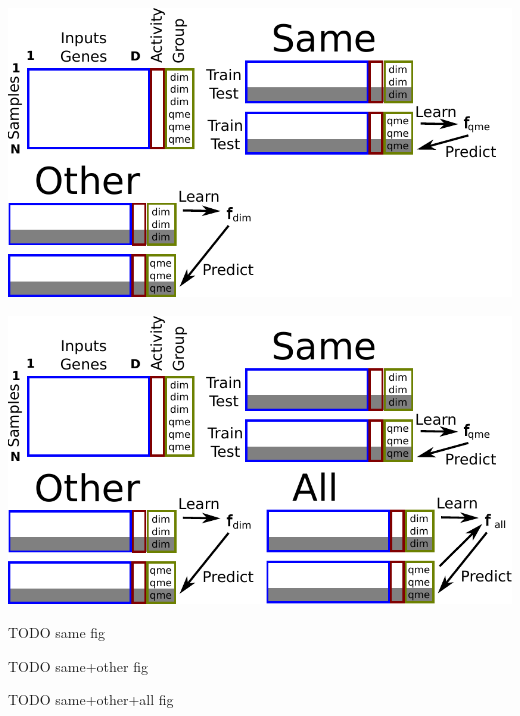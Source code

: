 \documentclass{beamer}
\begin{document}
\begin{frame}
  \includegraphics[width=\textwidth]{drawing-cv-same-other-3}
\end{frame}

\begin{frame}
  \includegraphics[width=\textwidth]{drawing-cv-same-other-4}
\end{frame}

\begin{frame}
  TODO same fig
\end{frame}

\begin{frame}
  TODO same+other fig
\end{frame}

\begin{frame}
  TODO same+other+all fig
\end{frame}
\end{document}

